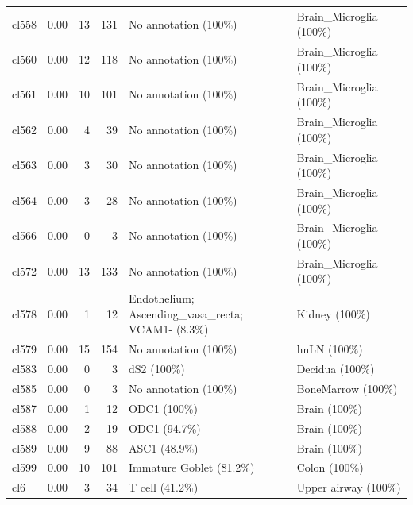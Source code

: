 \begin{table}[ht!]
\begin{tabular}{lrrrll}
  cl558 & 0.00 &  13 & 131 & No annotation (100\%) & Brain\_Microglia (100\%) \\ 
  cl560 & 0.00 &  12 & 118 & No annotation (100\%) & Brain\_Microglia (100\%) \\ 
  cl561 & 0.00 &  10 & 101 & No annotation (100\%) & Brain\_Microglia (100\%) \\ 
  cl562 & 0.00 &   4 &  39 & No annotation (100\%) & Brain\_Microglia (100\%) \\ 
  cl563 & 0.00 &   3 &  30 & No annotation (100\%) & Brain\_Microglia (100\%) \\ 
  cl564 & 0.00 &   3 &  28 & No annotation (100\%) & Brain\_Microglia (100\%) \\ 
  cl566 & 0.00 &   0 &   3 & No annotation (100\%) & Brain\_Microglia (100\%) \\ 
  cl572 & 0.00 &  13 & 133 & No annotation (100\%) & Brain\_Microglia (100\%) \\ 
  cl578 & 0.00 &   1 &  12 & \specialcell[t]{Endothelium; Ascending\_vasa\_recta;\\VCAM1- (8.3\%)} & Kidney (100\%) \\ 
  cl579 & 0.00 &  15 & 154 & No annotation (100\%) & hnLN (100\%) \\ 
  cl583 & 0.00 &   0 &   3 & dS2 (100\%) & Decidua (100\%) \\ 
  cl585 & 0.00 &   0 &   3 & No annotation (100\%) & BoneMarrow (100\%) \\ 
  cl587 & 0.00 &   1 &  12 & ODC1 (100\%) & Brain (100\%) \\ 
  cl588 & 0.00 &   2 &  19 & ODC1 (94.7\%) & Brain (100\%) \\ 
  cl589 & 0.00 &   9 &  88 & ASC1 (48.9\%) & Brain (100\%) \\ 
  cl599 & 0.00 &  10 & 101 & Immature Goblet (81.2\%) & Colon (100\%) \\ 
  cl6 & 0.00 &   3 &  34 & T cell (41.2\%) & Upper airway (100\%) \\ 
   \bottomrule
\end{tabular}
\end{table}


